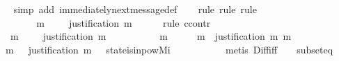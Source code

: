 \begin{isabellebody}
%
\isadelimproof
\ \ %
\endisadelimproof
%
\isatagproof
{}\isamarkupfalse%
\ {\isacharparenleft}simp\ add{\isacharcolon}\ immediately{\isacharunderscore}next{\isacharunderscore}message{\isacharunderscore}def{\isacharparenright}\isanewline
\ \ \isamarkupfalse%
\ {\isacharparenleft}rule{\isacharcomma}\ rule{\isacharcomma}\ rule{\isacharparenright}\isanewline
{}\isamarkupfalse%
\ {\isacharminus}\isanewline
\ \ \isamarkupfalse%
\ {\isasymsigma}\ {\isasymsigma}{\isacharprime}\isanewline
\ \ \isamarkupfalse%
\ {\isachardoublequoteopen}{\isasymsigma}\ {\isasymin}\ {\isasymSigma}{\isachardoublequoteclose}\isanewline
\ \ \isamarkupfalse%
\ {\isachardoublequoteopen}{\isasymsigma}{\isacharprime}\ {\isasymsubset}\ {\isasymsigma}{\isachardoublequoteclose}\isanewline
\ \ \isamarkupfalse%
\ {\isachardoublequoteopen}{\isasymexists}\ m\ {\isasymin}\ {\isasymsigma}\ {\isacharminus}\ {\isasymsigma}{\isacharprime}{\isachardot}\ justification\ m\ {\isasymsubseteq}\ {\isasymsigma}{\isacharprime}{\isachardoublequoteclose}\isanewline
\ \ \isamarkupfalse%
\ {\isacharparenleft}rule\ ccontr{\isacharparenright}\isanewline
\ \ \ \ \isamarkupfalse%
\ {\isachardoublequoteopen}{\isasymnot}\ {\isacharparenleft}{\isasymexists}\ m\ {\isasymin}\ {\isasymsigma}\ {\isacharminus}\ {\isasymsigma}{\isacharprime}{\isachardot}\ justification\ m\ {\isasymsubseteq}\ {\isasymsigma}{\isacharprime}{\isacharparenright}{\isachardoublequoteclose}\isanewline
\ \ \ \ \isamarkupfalse%
\ \isamarkupfalse%
\ {\isachardoublequoteopen}{\isasymforall}\ m\ {\isasymin}\ {\isasymsigma}\ {\isacharminus}\ {\isasymsigma}{\isacharprime}{\isachardot}\ {\isasymexists}\ m{\isacharprime}\ {\isasymin}\ justification\ m{\isachardot}\ m{\isacharprime}\ {\isasymin}\ {\isasymsigma}\ {\isacharminus}\ {\isasymsigma}{\isacharprime}{\isachardoublequoteclose}\isanewline
\ \ \ \ \ \ \isamarkupfalse%
\ {\isacartoucheopen}{\isasymnot}\ {\isacharparenleft}{\isasymexists}m{\isasymin}{\isasymsigma}\ {\isacharminus}\ {\isasymsigma}{\isacharprime}{\isachardot}\ justification\ m\ {\isasymsubseteq}\ {\isasymsigma}{\isacharprime}{\isacharparenright}{\isacartoucheclose}\ state{\isacharunderscore}is{\isacharunderscore}in{\isacharunderscore}pow{\isacharunderscore}Mi\ {\isacartoucheopen}{\isasymsigma}{\isacharprime}\ {\isasymsubset}\ {\isasymsigma}{\isacartoucheclose}\isanewline
\ \ \ \ \ \ \isamarkupfalse%
\ {\isacharparenleft}metis\ Diff{\isacharunderscore}iff\ {\isacartoucheopen}{\isasymsigma}\ {\isasymin}\ {\isasymSigma}{\isacartoucheclose}\ subset{\isacharunderscore}eq{\isacharparenright}\isanewline

\end{isabellebody}
